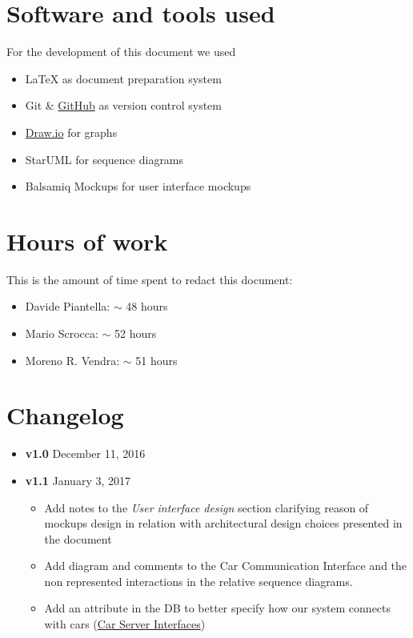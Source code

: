 \begin{appendices}

	\section{Software and tools used}
	For the development of this document we used
	\begin{itemize}
		\item \LaTeX{} as document preparation system
		\item Git \& \href{http://github.com}{GitHub} as version control system
		\item \href{http://draw.io}{Draw.io} for graphs 
		\item StarUML for sequence diagrams
		\item Balsamiq Mockups for user interface mockups
	\end{itemize}
	
	\section{Hours of work}
	This is the amount of time spent to redact this document:
	\begin{itemize}
		\item Davide Piantella: $\sim$ 48 hours
		\item Mario Scrocca: $\sim$ 52 hours
		\item Moreno R. Vendra: $\sim$ 51 hours
	\end{itemize}
	
		\section{Changelog}
	\begin{itemize}
		\item \textbf{v1.0} December 11, 2016
		\item \textbf{v1.1} January 3, 2017
		\begin{itemize}
			\item Add notes to the \emph{User interface design} section clarifying reason of mockups design in relation with architectural design choices presented in the document
			\item Add diagram and comments to the Car Communication Interface and the non represented interactions in the relative sequence diagrams.
			\item Add an attribute in the DB to better specify how our system connects with cars (\hyperref[sec:carServerInt]{Car Server Interfaces})
			

\end{itemize}
\end{itemize}
\end{appendices}
